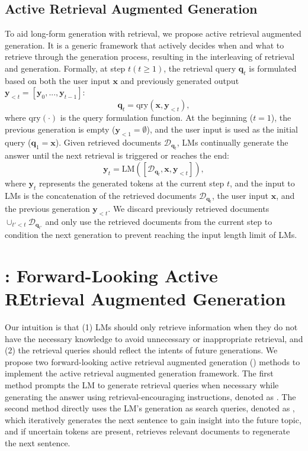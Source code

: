 \subsection{Active Retrieval Augmented Generation}\label{sec:activerag}
To aid long-form generation with retrieval, we propose active retrieval augmented generation.
It is a generic framework that actively decides when and what to retrieve through the generation process, resulting in the interleaving of retrieval and generation.
Formally, at step $t (t \ge 1)$, the retrieval query $\bm{q}_t$ is formulated based on both the user input $\bm{x}$ and previously generated output $\bm{y}_{<t}=[\bm{y}_0,...,\bm{y}_{t-1}]$:
\begin{equation*}
\bm{q}_t=\text{qry}(\bm{x}, \bm{y}_{<t}),
\end{equation*}
where $\text{qry}(\cdot)$ is the query formulation function.
At the beginning ($t=1$), the previous generation is empty ($\bm{y}_{<1}=\emptyset$), and the user input is used as the initial query ($\bm{q}_1=\bm{x}$).
Given retrieved documents $\mathcal{D}_{\bm{q}_t}$, LMs continually generate the answer until the next retrieval is triggered or reaches the end:
\begin{equation*}
\bm{y}_t=\text{LM}([\mathcal{D}_{\bm{q}_t},\bm{x}, \bm{y}_{<t}]),
\end{equation*}
where $\bm{y}_t$ represents the generated tokens at the current step $t$, and the input to LMs is the concatenation of the retrieved documents $\mathcal{D}_{\bm{q}_t}$, the user input $\bm{x}$, and the previous generation $\bm{y}_{<t}$.
We discard previously retrieved documents $\cup_{t'<t}\mathcal{D}_{\bm{q}_{t'}}$ and only use the retrieved documents from the current step to condition the next generation to prevent reaching the input length limit of LMs.

\section{\ours: Forward-Looking Active REtrieval Augmented Generation}
Our intuition is that (1) LMs should only retrieve information when they do not have the necessary knowledge to avoid unnecessary or inappropriate retrieval, and (2) the retrieval queries should reflect the intents of future generations.
We propose two forward-looking active retrieval augmented generation (\ours) methods to implement the active retrieval augmented generation framework.
The first method prompts the LM to generate retrieval queries when necessary while generating the answer using retrieval-encouraging instructions, denoted as \oursr.
The second method directly uses the LM's generation as search queries, denoted as \oursd, which iteratively generates the next sentence to gain insight into the future topic, and if uncertain tokens are present, retrieves relevant documents to regenerate the next sentence.

